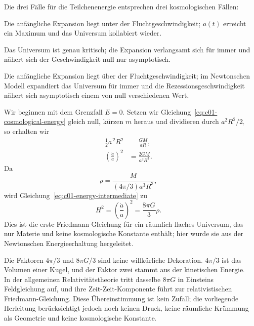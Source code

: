 Die drei Fälle für die Teilchenenergie entsprechen drei kosmologischen Fällen:
\begin{description}[style=nextline]
\item[\(E<0\):] Die anfängliche Expansion liegt unter der Fluchtgeschwindigkeit; \(a(t)\) erreicht ein Maximum und das Universum kollabiert wieder.
\item[\(E=0\):] Das Universum ist genau kritisch; die Expansion verlangsamt sich für immer und nähert sich der Geschwindigkeit null nur asymptotisch.
\item[\(E>0\):] Die anfängliche Expansion liegt über der Fluchtgeschwindigkeit; im Newtonschen Modell expandiert das Universum für immer und die Rezessionsgeschwindigkeit nähert sich asymptotisch einem von null verschiedenen Wert.
\end{description}

Wir beginnen mit dem Grenzfall \(E=0\). Setzen wir Gleichung~\eqref{eq:c01-cosmological-energy} gleich null, kürzen \(m\) heraus und dividieren durch \(a^2R^2/2\), so erhalten wir
\begin{align}
\frac12\dot a^{\,2}R^2&=\frac{GM}{aR}, \\
\left(\frac{\dot a}{a}\right)^2&=\frac{2GM}{a^3R^3}.
\label{eq:c01-energy-intermediate}
\end{align}
Da
\begin{equation}
\rho=\frac{M}{(4\pi/3)a^3R^3},
\end{equation}
wird Gleichung~\eqref{eq:c01-energy-intermediate} zu
\begin{equation}
\boxed{
H^2=\left(\frac{\dot a}{a}\right)^2=\frac{8\pi G}{3}\rho.
}
\label{eq:c01-first-friedmann}
\end{equation}
Dies ist die erste Friedmann-Gleichung für ein räumlich flaches Universum, das nur Materie und keine kosmologische Konstante enthält; hier wurde sie aus der Newtonschen Energieerhaltung hergeleitet.

\begin{classroomqa}
\end{classroomqa}

Die Faktoren \(4\pi/3\) und \(8\pi G/3\) sind keine willkürliche Dekoration. \(4\pi/3\) ist das Volumen einer Kugel, und der Faktor zwei stammt aus der kinetischen Energie. In der allgemeinen Relativitätstheorie tritt dasselbe \(8\pi G\) in Einsteins Feldgleichung auf, und ihre Zeit-Zeit-Komponente führt zur relativistischen Friedmann-Gleichung. Diese Übereinstimmung ist kein Zufall; die vorliegende Herleitung berücksichtigt jedoch noch keinen Druck, keine räumliche Krümmung als Geometrie und keine kosmologische Konstante.

